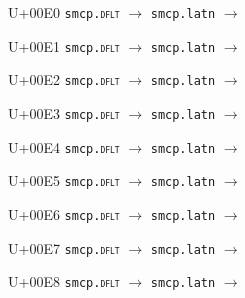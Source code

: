 \documentclass{article}
\begin{document}
\begin{substitutions}
\goodbreak

U+00E0  \linebreak
    \texttt{smcp.\textsc{dflt}} $\to$  \linebreak
    \texttt{smcp.latn} $\to$  

\goodbreak

U+00E1  \linebreak
    \texttt{smcp.\textsc{dflt}} $\to$  \linebreak
    \texttt{smcp.latn} $\to$  

\goodbreak

U+00E2  \linebreak
    \texttt{smcp.\textsc{dflt}} $\to$  \linebreak
    \texttt{smcp.latn} $\to$  

\goodbreak

U+00E3  \linebreak
    \texttt{smcp.\textsc{dflt}} $\to$  \linebreak
    \texttt{smcp.latn} $\to$  

\goodbreak

U+00E4  \linebreak
    \texttt{smcp.\textsc{dflt}} $\to$  \linebreak
    \texttt{smcp.latn} $\to$  

\goodbreak

U+00E5  \linebreak
    \texttt{smcp.\textsc{dflt}} $\to$  \linebreak
    \texttt{smcp.latn} $\to$  

\goodbreak

U+00E6  \linebreak
    \texttt{smcp.\textsc{dflt}} $\to$  \linebreak
    \texttt{smcp.latn} $\to$  

\goodbreak

U+00E7  \linebreak
    \texttt{smcp.\textsc{dflt}} $\to$  \linebreak
    \texttt{smcp.latn} $\to$  

\goodbreak

U+00E8  \linebreak
    \texttt{smcp.\textsc{dflt}} $\to$  \linebreak
    \texttt{smcp.latn} $\to$  


\end{substitutions}
\end{document}
